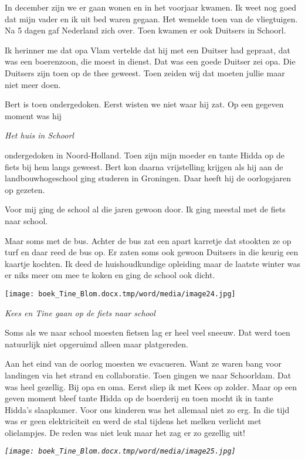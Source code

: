 \documentclass{scrbook}
\begin{document}
In december zijn we er gaan wonen en in het voorjaar kwamen. Ik weet nog goed dat mijn vader en ik uit bed waren gegaan. Het wemelde toen van de vliegtuigen. Na 5 dagen gaf Nederland zich over. Toen kwamen er ook Duitsers in Schoorl. 

Ik herinner me dat opa Vlam vertelde dat hij met een Duitser had gepraat, dat was een boerenzoon, die moest in dienst. Dat was een goede Duitser zei opa. Die Duitsers zijn toen op de thee geweest. Toen zeiden wij dat moeten jullie maar niet meer doen.

Bert is toen ondergedoken. Eerst wisten we niet waar hij zat. Op een gegeven moment was hij 

\textit{Het huis in Schoorl  }



  

ondergedoken in Noord-Holland. Toen zijn mijn moeder en tante Hidda op de fiets bij hem langs geweest. Bert kon daarna vrijstelling krijgen als hij aan de landbouwhogeschool ging studeren in Groningen. Daar heeft hij de oorlogsjaren op gezeten. 

Voor mij ging de school al die jaren gewoon door. Ik ging meestal met de fiets naar school.

Maar soms met de bus. Achter de bus zat een apart karretje dat stookten ze op turf en daar reed de bus op. Er zaten soms ook gewoon Duitsers in die keurig een kaartje kochten. Ik deed de huishoudkundige opleiding maar de laatste winter was er niks meer om mee te koken en ging de school ook dicht.

\texttt{[image: boek\_Tine\_Blom.docx.tmp/word/media/image24.jpg]}

\textit{Kees en Tine gaan op de fiets naar school}

Soms als we naar school moesten fietsen lag er heel veel sneeuw. Dat werd toen natuurlijk niet opgeruimd alleen maar platgereden.

Aan het eind van de oorlog moesten we evacueren. Want ze waren bang voor landingen via het strand en collaboratie. Toen gingen we naar Schoorldam. Dat was heel gezellig. Bij opa en oma. Eerst sliep ik met Kees op zolder. Maar op een geven moment bleef tante Hidda op de boerderij en toen mocht ik in tante Hidda’s slaapkamer. Voor ons kinderen was het allemaal niet zo erg. In die tijd was er geen elektriciteit en werd de stal tijdens het melken verlicht met olielampjes. De reden was niet leuk maar het zag er zo gezellig uit!

\textit{\texttt{[image: boek\_Tine\_Blom.docx.tmp/word/media/image25.jpg]}}
\end{document}
